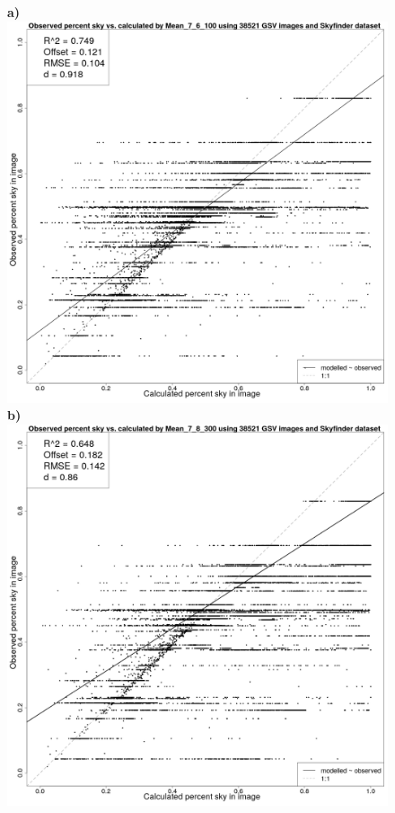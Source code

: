 \documentclass[final,3p,times,authoryear]{elsarticle}
\begin{document}
\begin{figure}
\centering
\textbf{a)}\includegraphics[scale=0.15]{Images/ErrorPlotsCombinedIndivMean_7_6_100.png}
\textbf{b)}\includegraphics[scale=0.15]{Images/ErrorPlotsCombinedIndivMean_7_8_300.png}

\end{figure}
\end{document}
